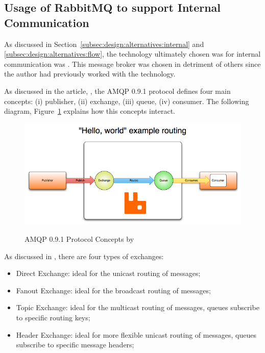 \subsection{Usage of RabbitMQ to support Internal Communication}
\label{subsec:implementation:decisions:rabbitmq}

As discussed in Section~\ref{subsec:design:alternatives:internal} and \ref{subsec:design:alternatives:flow}, the technology ultimately chosen was for internal communication was . This message broker was chosen in detriment of others since the author had previously worked with the technology.

As discussed in the article, , the \gls{AMQP} 0.9.1 protocol defines four main concepts: (i) publisher, (ii) exchange, (iii) queue, (iv) consumer. The following diagram, Figure~\ref{fig:implementation:decisions:rabbitmq} explains how this concepts interact.

\begin{figure}[H]
    \centering
    \resizebox{\columnwidth}{!}
    {
       \includegraphics{assets/figures/rabbitmq.png}
    }
    \caption[\gls{AMQP} 0.9.1 Protocol Concepts]{\gls{AMQP} 0.9.1 Protocol Concepts by \cite{rabbitmqexpl}}
    \label{fig:implementation:decisions:rabbitmq}
 \end{figure}

As discussed in , there are four types of exchanges: 

\begin{itemize}
    \item Direct Exchange: ideal for the unicast routing of messages;
    \item Fanout Exchange: ideal for the broadcast routing of messages;
    \item Topic Exchange: ideal for the multicast routing of messages, queues subscribe to specific routing keys;
    \item Header Exchange: ideal for more flexible unicast routing of messages, queues subscribe to specific message headers;
\end{itemize}

